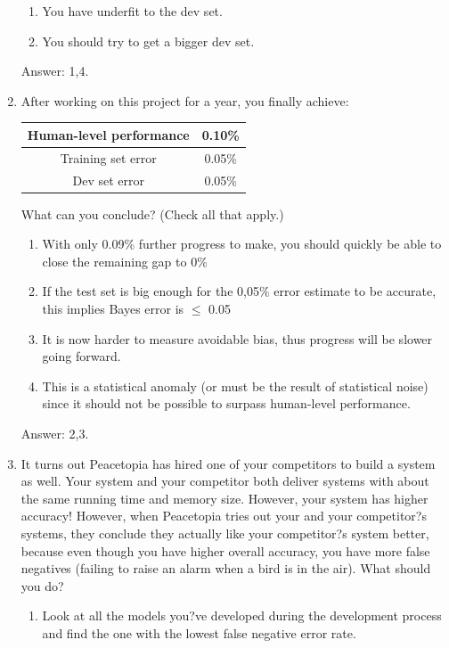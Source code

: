 \documentclass[12pt]{article}
\numberwithin{equation}{section}
\begin{document}
\begin{enumerate}
\begin{enumerate}
		\item You have underfit to the dev set.
		\item You should try to get a bigger dev set.
	\end{enumerate} \par
	Answer: 1,4.
	\item After working on this project for a year, you finally achieve:
	\begin{table}[h!]
  		\centering
  		\begin{tabular}{c|c}
    			Human-level performance & 0.10\% \\ \hline
			Training set error & 0.05\% \\ \hline
			Dev set error & 0.05\% \\ 
  		\end{tabular}
	\end{table} \par
	What can you conclude? (Check all that apply.)
	\begin{enumerate}
		\item With only 0.09\% further progress to make, you should quickly be able to close the remaining gap to 0\%
		\item If the test set is big enough for the 0,05\% error estimate to be accurate, this implies Bayes error is $\leqslant$ 0.05
		\item It is now harder to measure avoidable bias, thus progress will be slower going forward.
		\item This is a statistical anomaly (or must be the result of statistical noise) since it should not be possible to surpass human-level performance.
	\end{enumerate} \par
	Answer: 2,3.
	\item It turns out Peacetopia has hired one of your competitors to build a system as well. Your system and your competitor both deliver systems with about the same running time and memory size. However, your system has higher accuracy! However, when Peacetopia tries out your and your competitor?s systems, they conclude they actually like your competitor?s system better, because even though you have higher overall accuracy, you have more false negatives (failing to raise an alarm when a bird is in the air). What should you do? \par
	\begin{enumerate}
		\item Look at all the models you?ve developed during the development process and find the one with the lowest false negative error rate.

\end{enumerate}
\end{enumerate}
\end{document}
